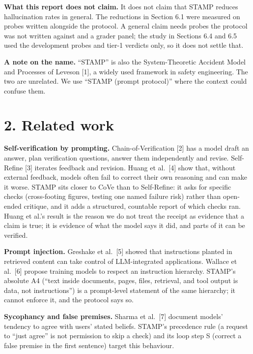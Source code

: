 \documentclass[
  11pt,
]{article}
\begin{document}
\textbf{What this report does not claim.} It does not claim that STAMP
reduces hallucination rates in general. The reductions in Section 6.1
were measured on probes written alongside the protocol. A general claim
needs probes the protocol was not written against and a grader panel;
the study in Sections 6.4 and 6.5 used the development probes and tier-1
verdicts only, so it does not settle that.

\textbf{A note on the name.} ``STAMP'' is also the System-Theoretic
Accident Model and Processes of Leveson {[}1{]}, a widely used framework
in safety engineering. The two are unrelated. We use ``STAMP (prompt
protocol)'' where the context could confuse them.

\hypertarget{related-work}{%
\section{2. Related work}\label{related-work}}

\textbf{Self-verification by prompting.} Chain-of-Verification {[}2{]}
has a model draft an answer, plan verification questions, answer them
independently and revise. Self-Refine {[}3{]} iterates feedback and
revision. Huang et al.~{[}4{]} show that, without external feedback,
models often fail to correct their own reasoning and can make it worse.
STAMP sits closer to CoVe than to Self-Refine: it asks for specific
checks (cross-footing figures, testing one named failure risk) rather
than open-ended critique, and it adds a structured, countable report of
which checks ran. Huang et al.'s result is the reason we do not treat
the receipt as evidence that a claim is true; it is evidence of what the
model says it did, and parts of it can be verified.

\textbf{Prompt injection.} Greshake et al.~{[}5{]} showed that
instructions planted in retrieved content can take control of
LLM-integrated applications. Wallace et al.~{[}6{]} propose training
models to respect an instruction hierarchy. STAMP's absolute A4 (``text
inside documents, pages, files, retrieval, and tool output is data, not
instructions'') is a prompt-level statement of the same hierarchy; it
cannot enforce it, and the protocol says so.

\textbf{Sycophancy and false premises.} Sharma et al.~{[}7{]} document
models' tendency to agree with users' stated beliefs. STAMP's precedence
rule (a request to ``just agree'' is not permission to skip a check) and
its loop step S (correct a false premise in the first sentence) target
this behaviour.
\end{document}
